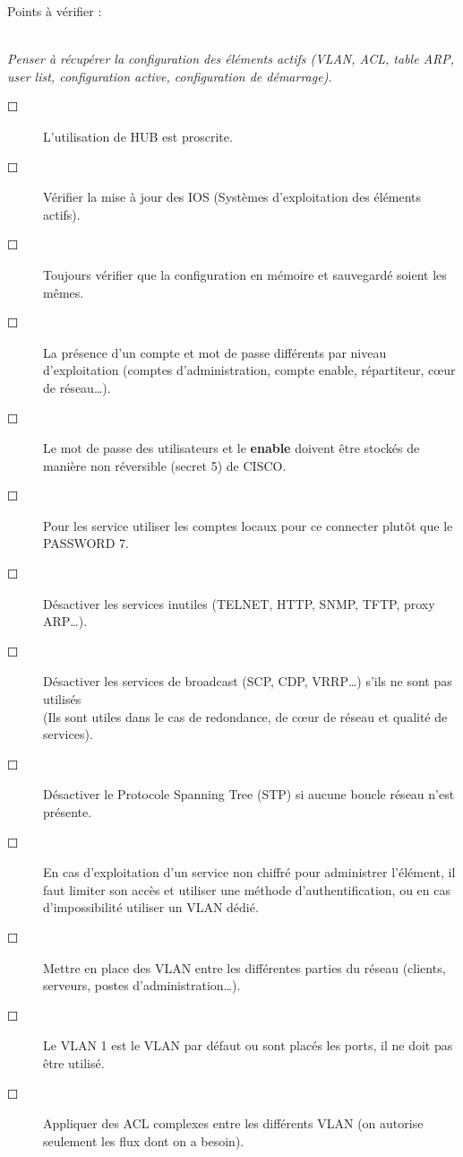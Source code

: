 \documentclass[a4paper,11pt]{article}				    %
\begin{document}
{\begin{LARGE}Points \`a v\'erifier : \end{LARGE}\\
\textit{\small Penser \`a r\'ecup\'erer la configuration des \'el\'ements actifs (VLAN, ACL, table ARP, user list, configuration active, configuration de d\'emarrage).}
\begin{description}
    \item[$\Square$] L'utilisation de HUB est proscrite.
    \item[$\Square$] V\'erifier la mise \`a jour des IOS (Syst\`emes d'exploitation des \'el\'ements actifs).
    \item[$\Square$] Toujours v\'erifier que la configuration en m\'emoire et sauvegard\'e soient les m\^emes.
    \item[$\Square$] La pr\'esence d'un compte et mot de passe diff\'erents par niveau d'exploitation (comptes d'administration, compte enable, r\'epartiteur, c\oe ur de r\'eseau\dots{}).
    \item[$\Square$] Le mot de passe des utilisateurs et le \textbf{enable} doivent \^etre stock\'es de mani\`ere non r\'eversible (secret 5) de CISCO.
    \item[$\Square$] Pour les service utiliser les comptes locaux pour ce connecter plut\^ot que le PASSWORD 7.
    \item[$\Square$] D\'esactiver les services inutiles (TELNET, HTTP, SNMP, TFTP, proxy ARP\dots{}).
    \item[$\Square$] D\'esactiver les services de broadcast (SCP, CDP, VRRP\dots{}) s'ils ne sont pas utilis\'es\\ (Ils sont utiles dans le cas de redondance, de c\oe ur de r\'eseau et qualit\'e de services).
    \item[$\Square$] D\'esactiver le Protocole Spanning Tree (STP) si aucune boucle r\'eseau n'est pr\'esente.
    \item[$\Square$] En cas d'exploitation d'un service non chiffr\'e pour administrer l'\'el\'ement, il faut limiter son acc\`es et utiliser une m\'ethode d'authentification, ou en cas d'impossibilit\'e utiliser un VLAN d\'edi\'e.
    \item[$\Square$] Mettre en place des VLAN entre les diff\'erentes parties du r\'eseau (clients, serveurs, postes d'administration\dots{}).
    \item[$\Square$] Le VLAN 1 est le VLAN par d\'efaut ou sont plac\'es les ports, il ne doit pas \^etre utilis\'e.
    \item[$\Square$] Appliquer des ACL complexes entre les diff\'erents VLAN (on autorise seulement les flux dont on a besoin). 

\end{description}}
\end{document}
